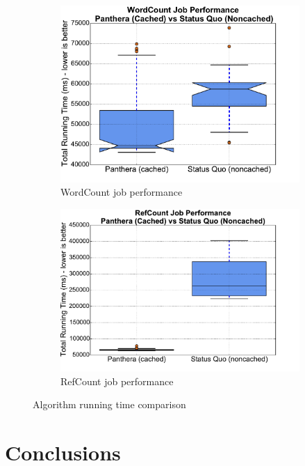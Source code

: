 \documentclass[12pt]{article}
\begin{document}
\begin{figure}
\centering
\begin{subfigure}{.5\textwidth}
  \centering
  \includegraphics[scale=0.3]{assets/v2/wordcount_boxplot.pdf}
  \caption{WordCount job performance}
  \label{fig:sub1}
\end{subfigure}%
\begin{subfigure}{.5\textwidth}
  \centering
  \includegraphics[scale=0.3]{assets/v2/refgetter_boxplot.pdf}
  \caption{RefCount job performance}
  \label{refgetter}
\end{subfigure}
\caption{Algorithm running time comparison}
\label{fig:test}
\end{figure}

\section{Conclusions}\label{sect:conclusions}
\end{document}
